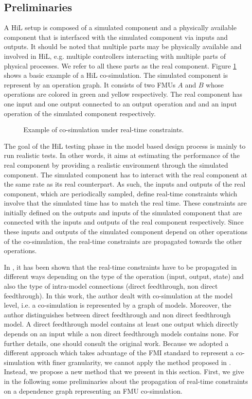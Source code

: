 \subsection{Preliminaries}

A HiL setup is composed of a simulated component and a physically available component that is interfaced with the simulated component via inputs and outputs. It should be noted that multiple parts may be physically available and involved in HiL, e.g. multiple controllers interacting with multiple parts of physical processes. We refer to all these parts as the real component. Figure \ref{fig:hilSetup} shows a basic example of a HiL co-simulation. The simulated component is represent by an operation graph. It consists of two FMUs $A$ and $B$ whose operations are colored in green and yellow respectively. The real component has one input and one output connected to an output operation and and an input operation of the simulated component respectively. 

\begin{figure}[phbt]
\centering

\caption{Example of co-simulation under real-time constraints.}
\label{fig:hilSetup}
\end{figure}

The goal of the HiL testing phase in the model based design process is mainly to run realistic tests. In other words, it aims at estimating the performance of the real component by providing a realistic environment through the simulated component. The simulated component has to interact with the real component at the same rate as its real counterpart. As such, the inputs and outputs of the real component, which are periodically sampled, define real-time constraints which involve that the simulated time has to match the real time. These constraints are initially defined on the outputs and inputs of the simulated component that are connected with the inputs and outputs of the real component respectively. Since these inputs and outputs of the simulated component depend on other operations of the co-simulation, the real-time constraints are propagated towards the other operations.

In \cite{faure:2011}, it has been shown that the real-time constraints have to be propagated in different ways depending on the type of the operation (input, output, state) and also the type of intra-model connections (direct feedthrough, non direct feedthrough). In this work, the author dealt with co-simulation at the model level, i.e. a co-simulation is represented by a graph of models. Moreover, the author distinguishes between direct feedthrough and non direct feedthrough model. A direct feedthrough model contains at least one output which directly depends on an input while a non direct feedthrough models contains none. For further details, one should consult the original work. Because we adopted a different approach which takes advantage of the FMI standard to represent a co-simulation with finer granularity, we cannot apply the method proposed in \cite{faure:2011}. Instead, we propose a new method that we present in this section. First, we give in the following some preliminaries about the propagation of real-time constraints on a dependence graph representing an FMU co-simulation. 

